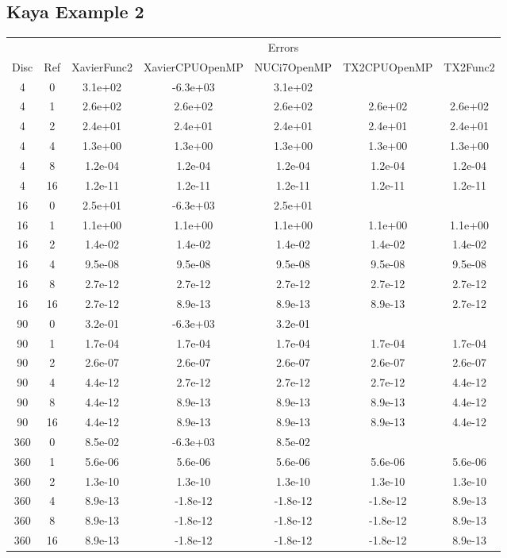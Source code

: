 \subsection{Kaya Example 2}
\begin{center}
\begin{tabular}{c|c|c|c|c|c|c}
	&&\multicolumn{5}{c}{Errors}\\
	Disc&Ref&XavierFunc2&XavierCPUOpenMP&NUCi7OpenMP&TX2CPUOpenMP&TX2Func2\\
\hline
4&0&3.1e+02&-6.3e+03&3.1e+02\\
4&1&2.6e+02&2.6e+02&2.6e+02&2.6e+02&2.6e+02\\
4&2&2.4e+01&2.4e+01&2.4e+01&2.4e+01&2.4e+01\\
4&4&1.3e+00&1.3e+00&1.3e+00&1.3e+00&1.3e+00\\
4&8&1.2e-04&1.2e-04&1.2e-04&1.2e-04&1.2e-04\\
4&16&1.2e-11&1.2e-11&1.2e-11&1.2e-11&1.2e-11\\
\hline
16&0&2.5e+01&-6.3e+03&2.5e+01\\
16&1&1.1e+00&1.1e+00&1.1e+00&1.1e+00&1.1e+00\\
16&2&1.4e-02&1.4e-02&1.4e-02&1.4e-02&1.4e-02\\
16&4&9.5e-08&9.5e-08&9.5e-08&9.5e-08&9.5e-08\\
16&8&2.7e-12&2.7e-12&2.7e-12&2.7e-12&2.7e-12\\
16&16&2.7e-12&8.9e-13&8.9e-13&8.9e-13&2.7e-12\\
\hline
90&0&3.2e-01&-6.3e+03&3.2e-01\\
90&1&1.7e-04&1.7e-04&1.7e-04&1.7e-04&1.7e-04\\
90&2&2.6e-07&2.6e-07&2.6e-07&2.6e-07&2.6e-07\\
90&4&4.4e-12&2.7e-12&2.7e-12&2.7e-12&4.4e-12\\
90&8&4.4e-12&8.9e-13&8.9e-13&8.9e-13&4.4e-12\\
90&16&4.4e-12&8.9e-13&8.9e-13&8.9e-13&4.4e-12\\
\hline
360&0&8.5e-02&-6.3e+03&8.5e-02\\
360&1&5.6e-06&5.6e-06&5.6e-06&5.6e-06&5.6e-06\\
360&2&1.3e-10&1.3e-10&1.3e-10&1.3e-10&1.3e-10\\
360&4&8.9e-13&-1.8e-12&-1.8e-12&-1.8e-12&8.9e-13\\
360&8&8.9e-13&-1.8e-12&-1.8e-12&-1.8e-12&8.9e-13\\
360&16&8.9e-13&-1.8e-12&-1.8e-12&-1.8e-12&8.9e-13\\
\hline
\end{tabular}
\end{center}







